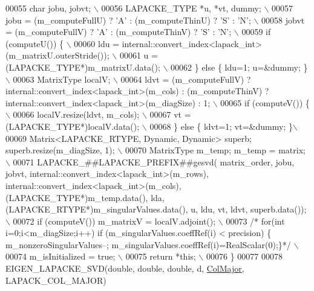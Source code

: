 \begin{DoxyCode}
00055 \textcolor{preprocessor}{  char jobu, jobvt; \(\backslash\)}
00056 \textcolor{preprocessor}{  LAPACKE\_TYPE *u, *vt, dummy; \(\backslash\)}
00057 \textcolor{preprocessor}{  jobu  = (m\_computeFullU) ? 'A' : (m\_computeThinU) ? 'S' : 'N'; \(\backslash\)}
00058 \textcolor{preprocessor}{  jobvt = (m\_computeFullV) ? 'A' : (m\_computeThinV) ? 'S' : 'N'; \(\backslash\)}
00059 \textcolor{preprocessor}{  if (computeU()) \{ \(\backslash\)}
00060 \textcolor{preprocessor}{    ldu  = internal::convert\_index<lapack\_int>(m\_matrixU.outerStride()); \(\backslash\)}
00061 \textcolor{preprocessor}{    u    = (LAPACKE\_TYPE*)m\_matrixU.data(); \(\backslash\)}
00062 \textcolor{preprocessor}{  \} else \{ ldu=1; u=&dummy; \}\(\backslash\)}
00063 \textcolor{preprocessor}{  MatrixType localV; \(\backslash\)}
00064 \textcolor{preprocessor}{  ldvt = (m\_computeFullV) ? internal::convert\_index<lapack\_int>(m\_cols) : (m\_computeThinV) ?
       internal::convert\_index<lapack\_int>(m\_diagSize) : 1; \(\backslash\)}
00065 \textcolor{preprocessor}{  if (computeV()) \{ \(\backslash\)}
00066 \textcolor{preprocessor}{    localV.resize(ldvt, m\_cols); \(\backslash\)}
00067 \textcolor{preprocessor}{    vt   = (LAPACKE\_TYPE*)localV.data(); \(\backslash\)}
00068 \textcolor{preprocessor}{  \} else \{ ldvt=1; vt=&dummy; \}\(\backslash\)}
00069 \textcolor{preprocessor}{  Matrix<LAPACKE\_RTYPE, Dynamic, Dynamic> superb; superb.resize(m\_diagSize, 1); \(\backslash\)}
00070 \textcolor{preprocessor}{  MatrixType m\_temp; m\_temp = matrix; \(\backslash\)}
00071 \textcolor{preprocessor}{  LAPACKE\_##LAPACKE\_PREFIX##gesvd( matrix\_order, jobu, jobvt, internal::convert\_index<lapack\_int>(m\_rows),
       internal::convert\_index<lapack\_int>(m\_cols), (LAPACKE\_TYPE*)m\_temp.data(), lda,
       (LAPACKE\_RTYPE*)m\_singularValues.data(), u, ldu, vt, ldvt, superb.data()); \(\backslash\)}
00072 \textcolor{preprocessor}{  if (computeV()) m\_matrixV = localV.adjoint(); \(\backslash\)}
00073 \textcolor{preprocessor}{ }\textcolor{comment}{/* for(int i=0;i<m\_diagSize;i++) if (m\_singularValues.coeffRef(i) < precision) \{
       m\_nonzeroSingularValues--; m\_singularValues.coeffRef(i)=RealScalar(0);\}*/}\textcolor{preprocessor}{ \(\backslash\)}
00074 \textcolor{preprocessor}{  m\_isInitialized = true; \(\backslash\)}
00075 \textcolor{preprocessor}{  return *this; \(\backslash\)}
00076 \textcolor{preprocessor}{\}}
00077 
00078 EIGEN\_LAPACKE\_SVD(\textcolor{keywordtype}{double},   \textcolor{keywordtype}{double},                \textcolor{keywordtype}{double}, d, \hyperlink{group__enums_ggaacded1a18ae58b0f554751f6cdf9eb13a0cbd4bdd0abcfc0224c5fcb5e4f6669a}{ColMajor}, LAPACK\_COL\_MAJOR)

\end{DoxyCode}
